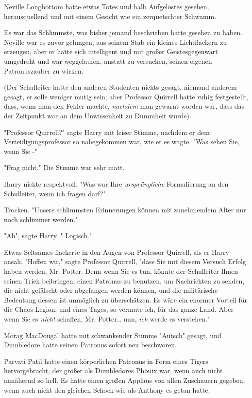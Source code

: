 {Neville Longbottom hatte etwas Totes und halb Aufgelöstes gesehen, herausquellend und mit einem Gesicht wie ein zerquetschter Schwamm.

Es war das Schlimmste, was bisher jemand beschrieben hatte gesehen zu haben. Neville war es zuvor gelungen, aus seinem Stab ein kleines Lichtflackern zu erzeugen, aber er hatte sich intelligent und mit großer Geistesgegenwart umgedreht und war weggelaufen, anstatt zu versuchen, seinen eigenen Patronuszauber zu wirken.

(Der Schulleiter hatte den anderen Studenten nichts gesagt, niemand anderem gesagt, er solle weniger mutig sein; aber Professor Quirrell hatte ruhig festgestellt, dass, wenn man den Fehler machte, \emph{nachdem} man gewarnt worden war, dass das der Zeitpunkt war an dem Unwissenheit zu Dummheit wurde).

"Professor Quirrell?" sagte Harry mit leiser Stimme, nachdem er dem Verteidigungsprofessor so nahegekommen war, wie er es wagte. "Was sehen Sie, wenn Sie -"

"Frag nicht." Die Stimme war sehr matt.

Harry nickte respektvoll. "Was war Ihre \emph{ursprüngliche} Formulierung an den Schulleiter, wenn ich fragen darf?"

Trocken. "Unsere schlimmsten Erinnerungen können mit zunehmendem Alter nur noch schlimmer werden."

"Ah", sagte Harry. " Logisch."

Etwas Seltsames flackerte in den Augen von Professor Quirrell, als er Harry ansah. "Hoffen wir," sagte Professor Quirrell, "dass Sie mit diesem Versuch Erfolg haben werden, Mr. Potter. Denn wenn Sie es tun, könnte der Schulleiter Ihnen seinen Trick beibringen, einen Patronus zu benutzen, um Nachrichten zu senden, die nicht gefälscht oder abgefangen werden können, und die militärische Bedeutung dessen ist unmöglich zu überschätzen. Es wäre ein enormer Vorteil für die Chaos-Legion, und eines Tages, so vermute ich, für das ganze Land. Aber wenn Sie es \emph{nicht} schaffen, Mr. Potter… nun, \emph{ich} werde es verstehen."

Morag MacDougal hatte mit schwankender Stimme "Autsch" gesagt, und Dumbledore hatte seinen Patronus sofort neu beschworen.

Parvati Patil hatte einen körperlichen Patronus in Form eines Tigers hervorgebracht, der größer als Dumbledores Phönix war, wenn auch nicht annähernd so hell. Es hatte einen großen Applaus von allen Zuschauern gegeben, wenn auch nicht den gleichen Schock wie als Anthony es getan hatte.

}
